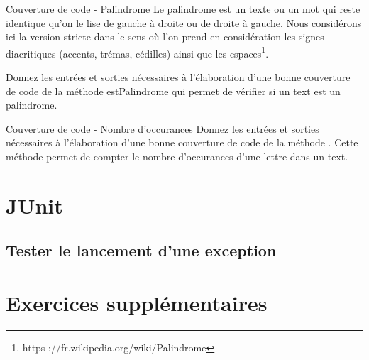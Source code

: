 \documentclass[a4paper,11pt]{article}
\begin{document}
	\begin{Exercice}{Couverture de code - Palindrome}
		Le palindrome est un texte ou un mot qui reste identique qu’on le lise de gauche à droite ou de droite à gauche. Nous considérons ici la version stricte dans le sens où l’on prend en considération les signes diacritiques (accents, trémas, cédilles) ainsi que les espaces\footnote{https ://fr.wikipedia.org/wiki/Palindrome}.

		Donnez les entrées et sorties nécessaires à l’élaboration d’une bonne couverture de code de la méthode estPalindrome qui permet de vérifier si un text est un palindrome.
	\end{Exercice}

	\begin{Exercice}{Couverture de code - Nombre d'occurances}
		Donnez les entrées et sorties nécessaires à l’élaboration d’une bonne couverture de code de la méthode . Cette méthode permet de compter le nombre d’occurances d’une lettre dans un text.
	\end{Exercice}


\section{JUnit}
	\subsection{Tester le lancement d'une exception}
	
	






\section{Exercices supplémentaires}
\end{document}
